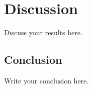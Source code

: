 \section{Discussion}
    Discuss your results here.


\subsection{Conclusion}
    Write your conclusion here. 
